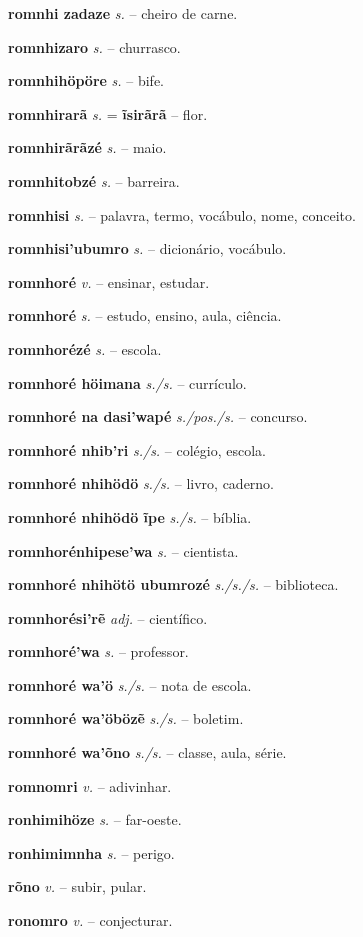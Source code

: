 \textbf{romnhi zadaze} \textit{s.} -- cheiro de carne.

\textbf{romnhizaro} \textit{s.} -- churrasco.

\textbf{romnhihöpöre} \textit{s.} -- bife.

\textbf{romnhirarã} \textit{s.} = \textbf{ĩsirãrã} -- flor.

\textbf{romnhirãrãzé} \textit{s.} -- maio.

\textbf{romnhitobzé} \textit{s.} -- barreira.

\textbf{romnhisi} \textit{s.} -- palavra, termo, vocábulo, nome, conceito.

\textbf{romnhisi'ubumro} \textit{s.} -- dicionário, vocábulo.

\textbf{romnhoré} \textit{v.} -- ensinar, estudar.

\textbf{romnhoré} \textit{s.} -- estudo, ensino, aula, ciência.

\textbf{romnhorézé} \textit{s.} -- escola.

\textbf{romnhoré höimana} \textit{s./s.} -- currículo.

\textbf{romnhoré na dasi'wapé} \textit{s./pos./s.} -- concurso.

\textbf{romnhoré nhib'ri} \textit{s./s.} -- colégio, escola.

\textbf{romnhoré nhihödö} \textit{s./s.} -- livro, caderno.

\textbf{romnhoré nhihödö ĩpe} \textit{s./s.} -- bíblia.

\textbf{romnhorénhipese'wa} \textit{s.} -- cientista.

\textbf{romnhoré nhihötö ubumrozé} \textit{s./s./s.} -- biblioteca.

\textbf{romnhorési'rẽ} \textit{adj.} -- científico.

\textbf{romnhoré'wa} \textit{s.} -- professor.

\textbf{romnhoré wa'ö} \textit{s./s.} -- nota de escola.

\textbf{romnhoré wa'öbözẽ} \textit{s./s.} -- boletim.

\textbf{romnhoré wa'õno} \textit{s./s.} -- classe, aula, série.

\textbf{romnomri} \textit{v.} -- adivinhar.

\textbf{ronhimihöze} \textit{s.} -- far-oeste.

\textbf{ronhimimnha} \textit{s.} -- perigo.

\textbf{rõno} \textit{v.} -- subir, pular.

\textbf{ronomro} \textit{v.} -- conjecturar.

